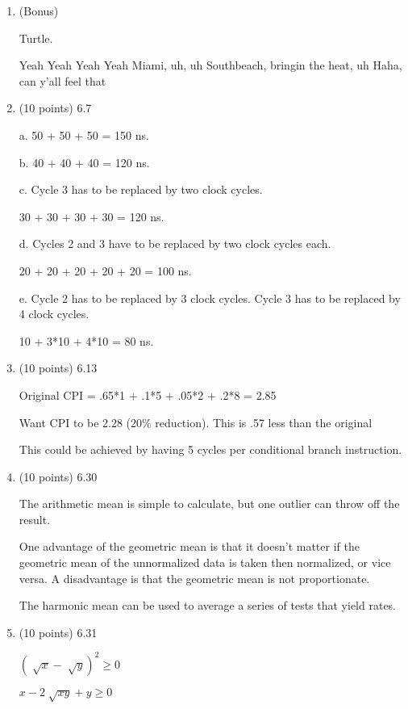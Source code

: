 \documentclass[letterpaper,10pt,onecolumn,titlepage]{article}
\begin{document}
\begin{enumerate}

\item (Bonus)

  Turtle.
  
  Yeah Yeah Yeah Yeah
  \newline
  Miami, uh, uh
  \newline
  Southbeach, bringin the heat, uh
  \newline
  Haha, can y'all feel that

\item (10 points) 6.7

  a.  50 + 50 + 50 = 150 ns.

  b.  40 + 40 + 40 = 120 ns.

  c.  Cycle 3 has to be replaced by two clock cycles.

  30 + 30 + 30 + 30 = 120 ns.

  d.  Cycles 2 and 3 have to be replaced by two clock cycles each.

  20 + 20 + 20 + 20 + 20 = 100 ns.

  e.  Cycle 2 has to be replaced by 3 clock cycles.  Cycle 3 has to be replaced  by 4 clock cycles.

  10 + 3*10 + 4*10 = 80 ns.

\item (10 points) 6.13

  Original CPI = .65*1 + .1*5 + .05*2 + .2*8 = 2.85

  Want CPI to be 2.28 (20\% reduction).  This is .57 less than the original

  This could be achieved by having 5 cycles per conditional branch instruction.

\item (10 points) 6.30

  The arithmetic mean is simple to calculate, but one outlier can throw off the result.

  One advantage of the geometric mean is that it doesn't matter if the geometric mean of the unnormalized data is taken then normalized, or vice versa.
  A disadvantage is that the geometric mean is not proportionate.

  The harmonic mean can be used to average a series of tests that yield rates.


\item (10 points) 6.31

  $(\sqrt[]{x} - \sqrt[]{y})^2  \geq  0$
  
  $x - 2\sqrt[]{xy} + y  \geq  0$
  

\end{enumerate}
\end{document}
